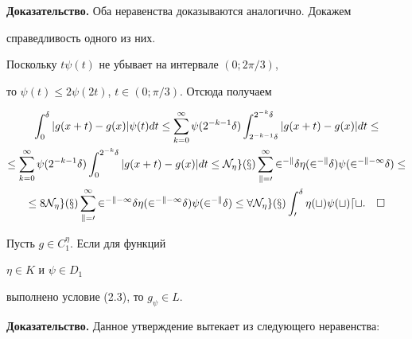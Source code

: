{\bf Доказательство.} Оба неравенства доказываются аналогично. Докажем


справедливость одного из них.


Поскольку $t\psi(t)$ не убывает на интервале $(0;2\pi/3)$,


то $\psi(t)\le2\psi(2t)$, $t\in(0;\pi/3)$. Отсюда получаем


\begin{multline*}


\int^\delta_0|g(x+t)-g(x)|\psi(t)dt\le\sum_{k=0}^\infty\psi(2^{-k-1}\delta)


\int_{2^{-k-1}\delta}^{2^{-k}\delta}|g(x+t)-g(x)|dt\le \\


%


\le\sum_{k=0}^\infty\psi(2^{-k-1}\delta)\int_0^{2^{-k}\delta}


|g(x+t)-g(x)|dt\le


\N_\eta g(x)\sum_{k=0}^\infty 2^{-k}\delta\eta(2^{-k}\delta)


\psi(2^{-k-1}\delta)\le \\


%


\le 8\N_\eta g(x)\sum_{k=0}^\infty


2^{-k-1}\delta\eta(2^{-k-1}\delta)\psi(2^{-k}\delta)\le


8\N_\eta g(x)\int_0^\delta\eta(t)\psi(t)dt.\quad\square


\end{multline*}





\begin{cor}


Пусть $g\in C^\eta_1$. Если для функций


$\eta\in K$ и $\psi\in D_1$


выполнено условие (2.3), то $g_\psi\in L$.


\end{cor}





{\bf Доказательство.} Данное утверждение вытекает из следующего неравенства:


